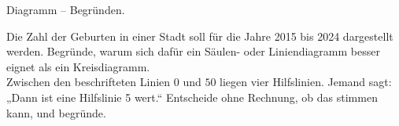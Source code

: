 \begin{aufgabe}{Diagramm -- Begründen.}
\begin{teile}
\teil Die Zahl der Geburten in einer Stadt soll für die Jahre 2015 bis 2024 dargestellt werden. Begründe, warum sich dafür ein Säulen- oder Liniendiagramm besser eignet als ein Kreisdiagramm. \\[12pt]
\teil Zwischen den beschrifteten Linien $0$ und $50$ liegen vier Hilfslinien. Jemand sagt: „Dann ist eine Hilfslinie 5 wert.“ Entscheide ohne Rechnung, ob das stimmen kann, und begründe. \\[12pt]
\end{teile}
\end{aufgabe}

